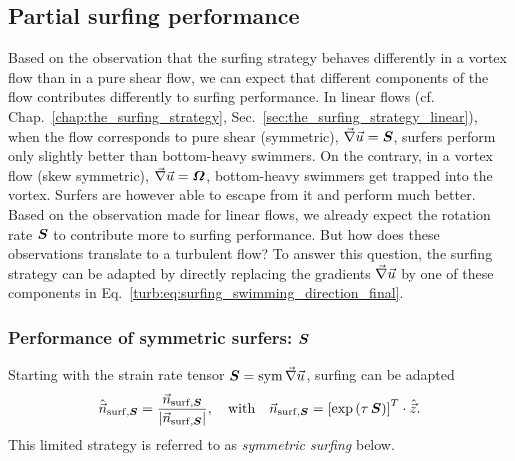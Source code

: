 \subsection{Partial surfing performance}\label{sec:partial}

Based on the observation that the surfing strategy behaves differently in a vortex flow than in a pure shear flow, we can expect that different components of the flow contributes differently to surfing performance.
In linear flows (cf. Chap.~\ref{chap:the_surfing_strategy}, Sec.~\ref{sec:the_surfing_strategy_linear}), when the flow corresponds to pure shear (symmetric), $\vec{\nabla} \vec{u} = \boldsymbol{S}$, surfers perform only slightly better than bottom-heavy swimmers.
On the contrary, in a vortex flow (skew symmetric), $\vec{\nabla} \vec{u} = \boldsymbol{\varOmega}$, bottom-heavy swimmers get trapped into the vortex. 
Surfers are however able to escape from it and perform much better.
Based on the observation made for linear flows, we already expect the rotation rate $\boldsymbol{S}$ to contribute more to surfing performance. 
But how does these observations translate to a turbulent flow?
To answer this question, the surfing strategy can be adapted by directly replacing the gradients $\vec{\nabla} \vec{u}$ by one of these components in Eq.~\eqref{turb:eq:surfing_swimming_direction_final}.

\subsubsection{Performance of symmetric surfers: $\boldsymbol{S}$}

Starting with the strain rate tensor $\boldsymbol{S} = \operatorname{sym} \vec{\nabla} \vec{u}$, surfing can be adapted
\begin{equation}\label{turb:eq:surf_partial_sym}
	\hat{\vec{n}}_{\mathrm{surf}, \boldsymbol{S}} = \frac{\vec{n}_{\mathrm{surf}, \boldsymbol{S}}}{\lvert\vec{n}_{\mathrm{surf}, \boldsymbol{S}}\rvert}, \quad \text{with} \quad \vec{n}_{\mathrm{surf}, \boldsymbol{S}} = \left[ \exp \left( \tau \, \boldsymbol{S} \right) \right]^T \cdot \hat{\vec{z}}.
\end{equation}
This limited strategy is referred to as \textit{symmetric surfing} below.

